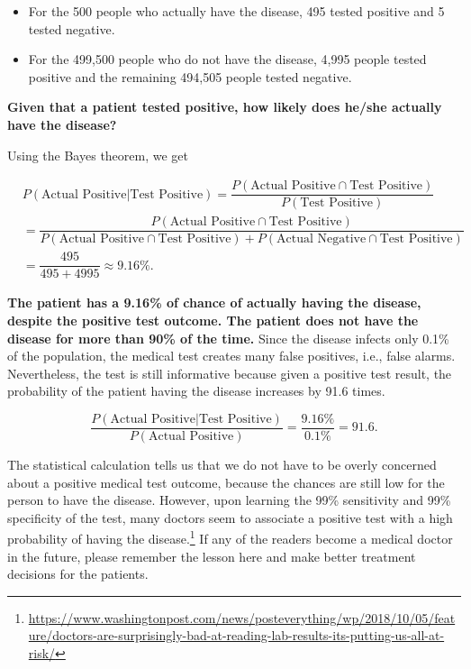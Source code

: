 \documentclass[
]{article}
\begin{document}
\begin{itemize}
\item
  For the 500 people who actually have the disease, 495 tested positive
  and 5 tested negative.
\item
  For the 499,500 people who do not have the disease, 4,995 people
  tested positive and the remaining 494,505 people tested negative.
\end{itemize}

\textbf{Given that a patient tested positive, how likely does he/she
actually have the disease?}

Using the Bayes theorem, we get

\[\begin{aligned}
& P(\text{Actual Positive}|\text{Test Positive}) = \dfrac{P(\text{Actual Positive} \cap \text{Test Positive})}{P(\text{Test Positive})}\\
&= \dfrac{P(\text{Actual Positive} \cap \text{Test Positive})}{P(\text{Actual Positive} \cap \text{Test Positive}) + P(\text{Actual Negative} \cap \text{Test Positive})}\\
&= \dfrac{495}{495 + 4995} \approx 9.16\%.
\end{aligned}\]

\textbf{The patient has a 9.16\% of chance of actually having the
disease, despite the positive test outcome. The patient does not have
the disease for more than 90\% of the time.} Since the disease infects
only 0.1\% of the population, the medical test creates many false
positives, i.e., false alarms. Nevertheless, the test is still
informative because given a positive test result, the probability of the
patient having the disease increases by 91.6 times.

\[\dfrac{P(\text{Actual Positive}|\text{Test Positive})}{P(\text{Actual Positive})} = \dfrac{9.16\%}{0.1\%} = 91.6.\]

The statistical calculation tells us that we do not have to be overly
concerned about a positive medical test outcome, because the chances are
still low for the person to have the disease. However, upon learning the
99\% sensitivity and 99\% specificity of the test, many doctors seem to
associate a positive test with a high probability of having the
disease.\footnote{\url{https://www.washingtonpost.com/news/posteverything/wp/2018/10/05/feature/doctors-are-surprisingly-bad-at-reading-lab-results-its-putting-us-all-at-risk/}}
If any of the readers become a medical doctor in the future, please
remember the lesson here and make better treatment decisions for the
patients.
\end{document}
